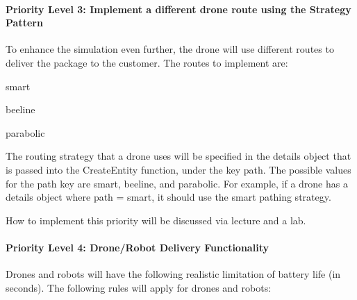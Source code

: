 \paragraph*{Priority Level 3\+: Implement a different drone route using the Strategy Pattern}

To enhance the simulation even further, the drone will use different routes to deliver the package to the customer. The routes to implement are\+:
\begin{DoxyItemize}
\item smart
\item beeline
\item parabolic
\end{DoxyItemize}

The routing strategy that a drone uses will be specified in the details object that is passed into the Create\+Entity function, under the key \textquotesingle{}path\textquotesingle{}. The possible values for the \textquotesingle{}path\textquotesingle{} key are \textquotesingle{}smart\textquotesingle{}, \textquotesingle{}beeline\textquotesingle{}, and \textquotesingle{}parabolic\textquotesingle{}. For example, if a drone has a details object where \textquotesingle{}path\textquotesingle{} = \textquotesingle{}smart\textquotesingle{}, it should use the \textquotesingle{}smart\textquotesingle{} pathing strategy.

How to implement this priority will be discussed via lecture and a lab.

\paragraph*{Priority Level 4\+: Drone/\+Robot Delivery Functionality}

Drones and robots will have the following realistic limitation of battery life (in seconds). The following rules will apply for drones and robots\+:



